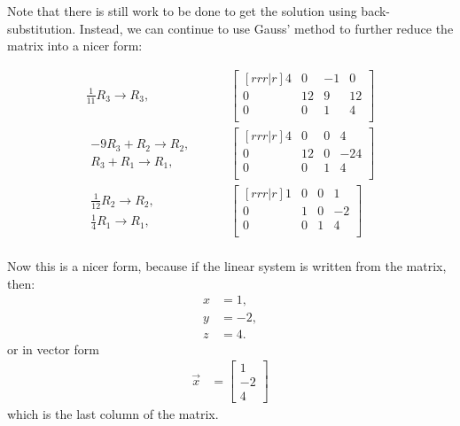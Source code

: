Note that there is still work to be done to get the solution using back-sub\-sti\-tution.  Instead, we can continue to use Gauss' method to further reduce the matrix into a nicer form:

\begin{align*}
\frac{1}{11} R_3 \rightarrow R_3, & \qquad
\begin{bmatrix}[rrr|r]
4 & 0 & -1 & 0 \\
0 & 12 & 9 & 12 \\
0 & 0 & 1 & 4 \\
\end{bmatrix}  \\
\begin{array}{r}	
-9R_3+R_2 \rightarrow R_2, \\
R_3 + R_1 \rightarrow R_1, 
\end{array} & \qquad 
\begin{bmatrix}[rrr|r]
4 & 0 & 0 & 4 \\
0 & 12 & 0 & -24 \\
0 & 0 & 1 & 4 \\
\end{bmatrix}  \\
\begin{array}{r}
\frac{1}{12} R_2 \rightarrow R_2, \\[4pt]
\frac{1}{4} R_1 \rightarrow R_1, 
\end{array} & \qquad
\begin{bmatrix}[rrr|r]
1 & 0 & 0 & 1 \\
0 & 1 & 0 & -2 \\
0 & 0 & 1 & 4 \\
\end{bmatrix}  \\
\end{align*}

Now this is a nicer form, because if the linear system is written from the matrix, then:
%
\begin{align*}
x & = 1, \\
y & = -2, \\
z & = 4.
\end{align*}
or in vector form 
%
\begin{align*}
\vec{x} & = \begin{bmatrix}
1 \\ -2 \\ 4
\end{bmatrix}
\end{align*}
which is the last column of the matrix.  

